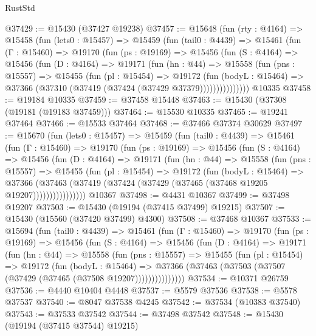 \begin{lexlean}{RustStd}
\begin{coremodule}
{\begin{coremodule}
{{{{{{{{{{{{{{{{{{{{{{{{{{{{{{{{{{{{{{{{{{{{{{{{{{{{{{{{{{{{@37429 := @15430 (@37427 @19238)
@37457 := @15648
    (fun (rty : @4164) =>
    @15458
      (fun (lets0 : @15457) =>
      @15459
        (fun (tail0 : @4439) =>
        @15461
          (fun (Γ : @15460) =>
          @19170
            (fun (ps : @19169) =>
            @15456
              (fun (S : @4164) =>
              @15456
                (fun (D : @4164) =>
                @19171
                  (fun (hn : @44) =>
                  @15558
                    (fun (pns : @15557) =>
                    @15455
                      (fun (pl : @15454) =>
                      @19172
                        (fun (bodyL : @15464) =>
                        @37366 (@37310 (@37419 (@37424 (@37429 @37379)))))))))))))))
    @10335
@37458 := @19184 @10335
@37459 := @37458 @15448
@37463 := @15430 (@37308 (@19181 (@19183 @37459)))
@37464 := @15530 @10335
@37465 := @19241 @37464
@37466 := @15533 @37464
@37468 := @37466 @37374 @30629
@37497 := @15670
    (fun (lets0 : @15457) =>
    @15459
      (fun (tail0 : @4439) =>
      @15461
        (fun (Γ : @15460) =>
        @19170
          (fun (ps : @19169) =>
          @15456
            (fun (S : @4164) =>
            @15456
              (fun (D : @4164) =>
              @19171
                (fun (hn : @44) =>
                @15558
                  (fun (pns : @15557) =>
                  @15455
                    (fun (pl : @15454) =>
                    @19172
                      (fun (bodyL : @15464) =>
                      @37366
                        (@37463
                          (@37419 (@37424 (@37429 (@37465 (@37468 @19205 @19207))))))))))))))))
    @10367
@37498 := @4431 @10367
@37499 := @37498 @19207
@37503 := @15430 (@19194 (@37415 @37499) @19215)
@37507 := @15430 (@15560 (@37420 @37499) @4300)
@37508 := @37468 @10367
@37533 := @15694
    (fun (tail0 : @4439) =>
    @15461
      (fun (Γ : @15460) =>
      @19170
        (fun (ps : @19169) =>
        @15456
          (fun (S : @4164) =>
          @15456
            (fun (D : @4164) =>
            @19171
              (fun (hn : @44) =>
              @15558
                (fun (pns : @15557) =>
                @15455
                  (fun (pl : @15454) =>
                  @19172
                    (fun (bodyL : @15464) =>
                    @37366 (@37463 (@37503 (@37507 (@37429 (@37465 (@37508 @19207)))))))))))))))
@37534 := @10371 @26759
@37536 := @4440 @10404 @4448
@37537 := @5579 @37536
@37538 := @5578 @37537
@37540 := @8047 @37538 @4245
@37542 := @37534 (@10383 @37540)
@37543 := @37533 @37542
@37544 := @37498 @37542
@37548 := @15430 (@19194 (@37415 @37544) @19215)
}}}}}}}}}}}}}}}}}}}}}}}}}}}}}}}}}}}}}}}}}}}}}}}}}}}}}}}}}}}}
\end{coremodule}}
\end{coremodule}
\end{lexlean}

